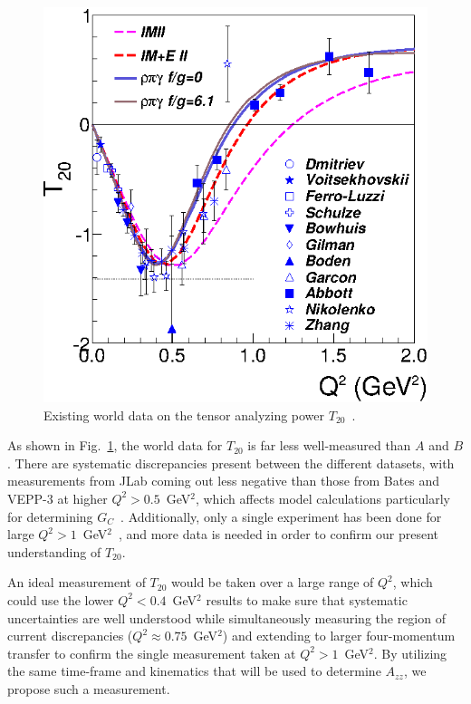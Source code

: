 \begin{figure}
\begin{center}
\includegraphics{figs/t20_data.eps} 
\caption{\label{t20-world}Existing world data on the tensor analyzing power $T_{20}$~\cite{Holt:2012gg}.}
\end{center}
\end{figure}

As shown in Fig.~\ref{t20-world}, the world data for $T_{20}$ is far less well-measured than $A$ and $B$. There are systematic discrepancies present between the different datasets, with measurements from JLab coming out less negative than those from Bates and VEPP-3 at higher $Q^2>0.5$~GeV$^2$, which affects model calculations particularly for determining $G_C$~\cite{Gilman:2001yh}.  Additionally, only a single experiment has been done for large $Q^2>1$~GeV$^2$~\cite{Abbott:2000fg}, and more data is needed in order to confirm our present understanding of $T_{20}$.

An ideal measurement of $T_{20}$ would be taken over a large range of $Q^2$, which could use the lower $Q^2<0.4$~GeV$^2$ results to make sure that systematic uncertainties are well understood while simultaneously measuring the region of current discrepancies ($Q^2\approx0.75$~GeV$^2$) and extending to larger four-momentum transfer to confirm the single measurement taken at $Q^2>1$~GeV$^2$. By utilizing the same time-frame and kinematics that will be used to determine $A_{zz}$, we propose such a measurement.